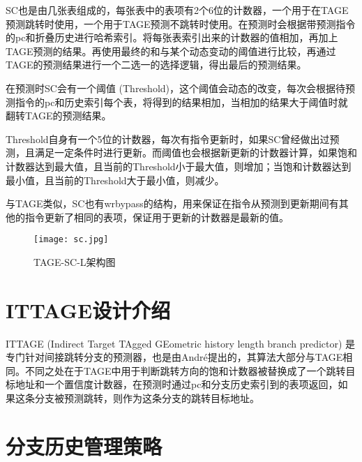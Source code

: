 SC也是由几张表组成的，每张表中的表项有2个6位的计数器，一个用于在TAGE预测跳转时使用，一个用于TAGE预测不跳转时使用。在预测时会根据带预测指令的pc和折叠历史进行哈希索引。将每张表索引出来的计数器的值相加，再加上TAGE预测的结果。再使用最终的和与某个动态变动的阈值进行比较，再通过TAGE的预测结果进行一个二选一的选择逻辑，得出最后的预测结果。

在预测时SC会有一个阈值 (Threshold)，这个阈值会动态的改变，每次会根据待预测指令的pc和历史索引每个表，将得到的结果相加，当相加的结果大于阈值时就翻转TAGE的预测结果。

Threshold自身有一个5位的计数器，每次有指令更新时，如果SC曾经做出过预测，且满足一定条件时进行更新。而阈值也会根据新更新的计数器计算，如果饱和计数器达到最大值，且当前的Threshold小于最大值，则增加；当饱和计数器达到最小值，且当前的Threshold大于最小值，则减少。


与TAGE类似，SC也有wrbypass的结构，用来保证在指令从预测到更新期间有其他的指令更新了相同的表项，保证用于更新的计数器是最新的值。

\begin{figure}[htb]
	\centering
	\setlength\tabcolsep{3pt}  %
	\vspace{5pt} %
	\texttt{[image: sc.jpg]}
	\caption{TAGE-SC-L架构图\cite{tage-sc-l}}
	\label{fig:figure24}
\end{figure}


\section{ITTAGE设计介绍}

ITTAGE (Indirect Target TAgged GEometric history length branch predictor)\cite{tage, ittage} 是专门针对间接跳转分支的预测器，也是由André提出的，其算法大部分与TAGE相同。不同之处在于TAGE中用于判断跳转方向的饱和计数器被替换成了一个跳转目标地址和一个置信度计数器，在预测时通过pc和分支历史索引到的表项返回，如果这条分支被预测跳转，则作为这条分支的跳转目标地址。

\section{分支历史管理策略}

